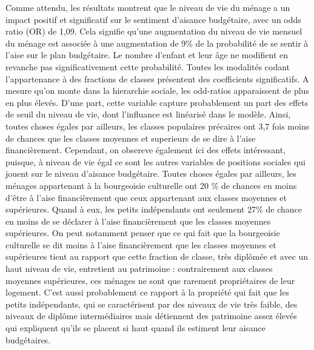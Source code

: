 \documentclass[
  12pt,
]{book}
\begin{document}
Comme attendu, les résultats montrent que le niveau de vie du ménage a
un impact positif et significatif sur le sentiment d'aisance budgétaire,
avec un odds ratio (OR) de 1,09. Cela signifie qu'une augmentation du
niveau de vie mensuel du ménage est associée à une augmentation de 9\%
de la probabilité de se sentir à l'aise sur le plan budgétaire. Le
nombre d'enfant et leur âge ne modifient en revanche pas
significativement cette probabilité. Toutes les modalités codant
l'appartenance à des fractions de classes présentent des coefficients
significatifs. A mesure qu'on monte dans la hierarchie sociale, les
odd-ratios apparaissent de plus en plus élevés. D'une part, cette
variable capture probablement un part des effets de seuil du niveau de
vie, dont l'influance est linéarisé dans le modèle. Ainsi, toutes choses
égales par ailleurs, les classes populaires précaires ont 3,7 fois moins
de chances que les classes moyennes et superieurs de se dire à l'aise
financièrement. Cependant, on obsereve également ici des effets
intéressant, puisque, à niveau de vie égal ce sont les autres variables
de positions sociales qui jouent sur le niveau d'aisance budgétaire.
Toutes choses égales par ailleurs, les ménages appartenant à la
bourgeoisie culturelle ont 20 \% de chances en moins d'être à l'aise
financièrement que ceux appartenant aux classes moyennes et supérieures.
Quand à eux, les petits indépendants ont seulement 27\% de chance en
moins de se déclarer à l'aise financièrement que les classes moyennes
supérieures. On peut notamment penser que ce qui fait que la bourgeoisie
culturelle se dit moins à l'aise financièrement que les classes moyennes
et supérieures tient au rapport que cette fraction de classe, très
diplômée et avec un haut niveau de vie, entretient au patrimoine :
contrairement aux classes moyennes supérieures, ces ménages ne sont que
rarement propriétaires de leur logement. C'est aussi probablement ce
rapport à la propriété qui fait que les petits indépendants, qui se
caractérisent par des niveaux de vie très faible, des niveaux de diplôme
intermédiaires mais détiennent des patrimoine assez élevés qui
expliquent qu'ils se placent si haut quand ils estiment leur aisance
budgétaires.
\end{document}
